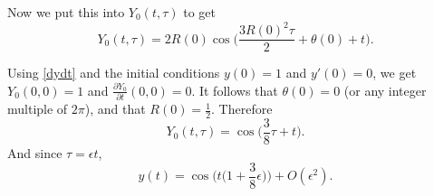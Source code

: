 \documentclass[11pt]{article}
\begin{document}
Now we put this into $Y_0(t,\tau)$ to get
\[
Y_0(t,\tau)=2R(0)\cos\Big( \frac{3R(0)^2\tau}{2}+\theta(0)+t\Big).
\]

Using \eqref{dydt} and the initial conditions $y(0)=1$ and $y'(0)=0$, we get $Y_0(0,0)=1$
and $\frac{\partial Y_0}{\partial t}(0,0)=0$. It follows that $\theta(0)=0$ (or any integer multiple of $2\pi$), and that $R(0)=\frac{1}{2}$. Therefore
\[
Y_0(t,\tau)=\cos\Big(\frac{3}{8}\tau +t\Big).
\]
And since $\tau=\epsilon t$, 
\[
y(t)=\cos\Big( t \Big(1+\frac{3}{8}\epsilon\Big)\Big)+O(\epsilon^2).
\]
\end{document}
